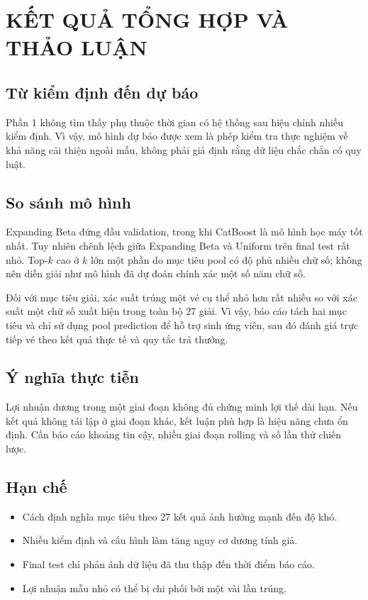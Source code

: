 \chapter{KẾT QUẢ TỔNG HỢP VÀ THẢO LUẬN}
\section{Từ kiểm định đến dự báo}
Phần 1 không tìm thấy phụ thuộc thời gian có hệ thống sau hiệu chỉnh nhiều kiểm định. Vì vậy, mô hình dự báo được xem là phép kiểm tra thực nghiệm về khả năng cải thiện ngoài mẫu, không phải giả định rằng dữ liệu chắc chắn có quy luật.

\section{So sánh mô hình}
Expanding Beta đứng đầu validation, trong khi CatBoost là mô hình học máy tốt nhất. Tuy nhiên chênh lệch giữa Expanding Beta và Uniform trên final test rất nhỏ. Top-$k$ cao ở $k$ lớn một phần do mục tiêu pool có độ phủ nhiều chữ số; không nên diễn giải như mô hình đã dự đoán chính xác một số năm chữ số.

Đối với mục tiêu giải, xác suất trúng một vé cụ thể nhỏ hơn rất nhiều so với xác suất một chữ số xuất hiện trong toàn bộ 27 giải. Vì vậy, báo cáo tách hai mục tiêu và chỉ sử dụng pool prediction để hỗ trợ sinh ứng viên, sau đó đánh giá trực tiếp vé theo kết quả thực tế và quy tắc trả thưởng.

\section{Ý nghĩa thực tiễn}
Lợi nhuận dương trong một giai đoạn không đủ chứng minh lợi thế dài hạn. Nếu kết quả không tái lập ở giai đoạn khác, kết luận phù hợp là hiệu năng chưa ổn định. Cần báo cáo khoảng tin cậy, nhiều giai đoạn rolling và số lần thử chiến lược.

\section{Hạn chế}
\begin{itemize}
\item Cách định nghĩa mục tiêu theo 27 kết quả ảnh hưởng mạnh đến độ khó.
\item Nhiều kiểm định và cấu hình làm tăng nguy cơ dương tính giả.
\item Final test chỉ phản ánh dữ liệu đã thu thập đến thời điểm báo cáo.
\item Lợi nhuận mẫu nhỏ có thể bị chi phối bởi một vài lần trúng.
\end{itemize}
